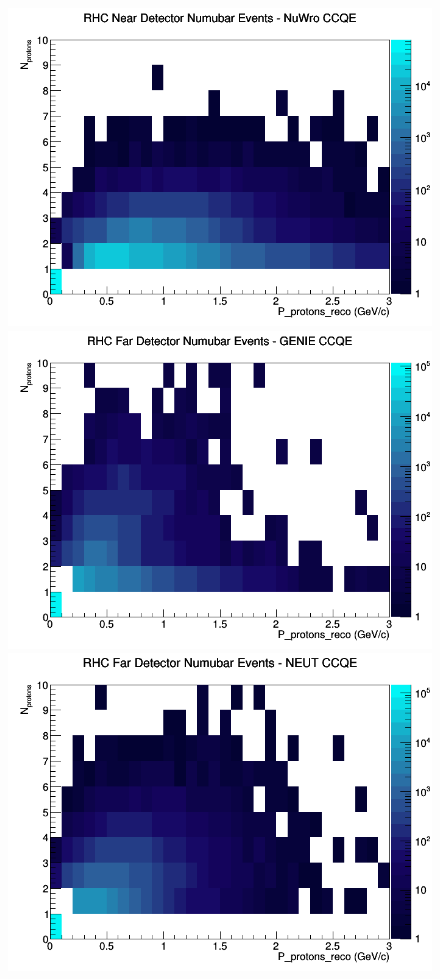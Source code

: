 \begin{figure}[h]
\includegraphics[width=\linewidth]{eff_N_P/FGT/protons/CCQE_RHC_ND_numubar_N_P_NuWro.png}
\endminipage
\newline
{}
\includegraphics[width=\linewidth]{eff_N_P/FGT/protons/CCQE_RHC_FD_numubar_N_P_GENIE.png}
\endminipage
{}
\includegraphics[width=\linewidth]{eff_N_P/FGT/protons/CCQE_RHC_FD_numubar_N_P_NEUT.png}

\end{figure}
